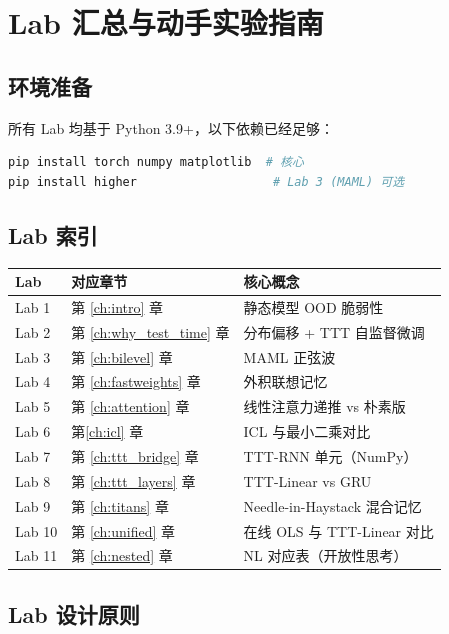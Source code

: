 \chapter{Lab 汇总与动手实验指南}
\label{app:labs}

\section{环境准备}

所有 Lab 均基于 Python 3.9+，以下依赖已经足够：

\begin{lstlisting}[language=bash]
pip install torch numpy matplotlib  # 核心
pip install higher                   # Lab 3 (MAML) 可选
\end{lstlisting}

\section{Lab 索引}

\begin{center}
\begin{tabular}{lll}
\toprule
Lab & 对应章节 & 核心概念 \\
\midrule
Lab 1 & 第 \ref{ch:intro} 章 & 静态模型 OOD 脆弱性 \\
Lab 2 & 第 \ref{ch:why_test_time} 章 & 分布偏移 + TTT 自监督微调 \\
Lab 3 & 第 \ref{ch:bilevel} 章 & MAML 正弦波 \\
Lab 4 & 第 \ref{ch:fastweights} 章 & 外积联想记忆 \\
Lab 5 & 第 \ref{ch:attention} 章 & 线性注意力递推 vs 朴素版 \\
Lab 6 & 第\ref{ch:icl} 章 & ICL 与最小二乘对比 \\
Lab 7 & 第 \ref{ch:ttt_bridge} 章 & TTT-RNN 单元（NumPy） \\
Lab 8 & 第 \ref{ch:ttt_layers} 章 & TTT-Linear vs GRU \\
Lab 9 & 第 \ref{ch:titans} 章 & Needle-in-Haystack 混合记忆 \\
Lab 10 & 第 \ref{ch:unified} 章 & 在线 OLS 与 TTT-Linear 对比 \\
Lab 11 & 第 \ref{ch:nested} 章 & NL 对应表（开放性思考） \\
\bottomrule
\end{tabular}
\end{center}

\section{Lab 设计原则}

